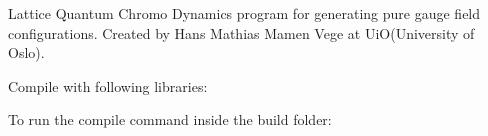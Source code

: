 Lattice Quantum Chromo Dynamics program for generating pure gauge field configurations. Created by Hans Mathias Mamen Vege at Ui\+O(\+University of Oslo).

Compile with following libraries\+: 
\begin{DoxyCode}{0}
\end{DoxyCode}
 To run the compile command inside the {\ttfamily build} folder\+: 
\begin{DoxyCode}{0}
\end{DoxyCode}
 